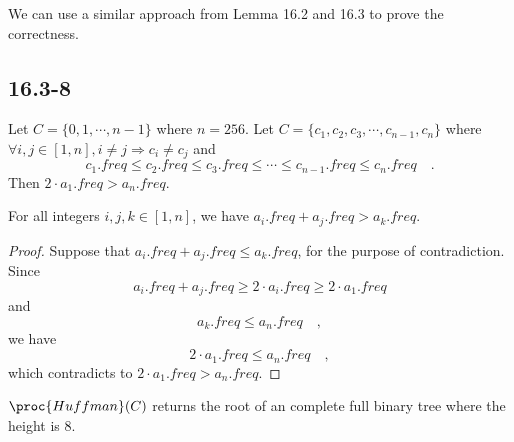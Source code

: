 We can use a similar approach from Lemma 16.2 and 16.3 to prove the correctness.

\subsection*{16.3-8}

Let $C = \{ 0, 1, \cdots, n - 1 \}$ where $n = 256$.
Let $C = \{ c_1, c_2, c_3, \cdots, c_{n-1}, c_n \}$
where $\forall i,j \in [1,n], i \neq j \Longrightarrow c_i \neq c_j$
and
\begin{equation*}
    c_1.freq \leq c_2.freq \leq c_3.freq \leq 
    \cdots \leq c_{n-1}.freq \leq c_n.freq
    \quad .
\end{equation*}
Then $2 \cdot a_1.freq > a_n.freq$.

\begin{lemma}
    For all integers $i,j,k \in [1,n]$, 
    we have $a_i.freq + a_j.freq > a_k.freq$.
\end{lemma}

\begin{proof}
    Suppose that $a_i.freq + a_j.freq \leq a_k.freq$,
    for the purpose of contradiction.
    Since
    \begin{equation*}
        a_i.freq + a_j.freq \geq 2 \cdot a_i.freq \geq 2 \cdot a_1.freq
    \end{equation*}
    and
    \begin{equation*}
        a_k.freq \leq a_n.freq
        \quad ,
    \end{equation*}
    we have 
    \begin{equation*}
        2 \cdot a_1.freq \leq a_n.freq
        \quad,
    \end{equation*}
    which contradicts to $2 \cdot a_1.freq > a_n.freq$.
\end{proof}

\begin{lemma}
    $\proc{Huffman}(C)$ returns the root of 
    an complete full binary tree where the height is $8$.
\end{lemma}

